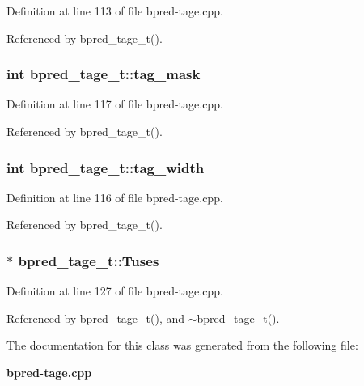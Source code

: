 Definition at line 113 of file bpred-tage.cpp.

Referenced by bpred\_\-tage\_\-t().
\subsubsection[{tag\_\-mask}]{\setlength{\rightskip}{0pt plus 5cm}int {\bf bpred\_\-tage\_\-t::tag\_\-mask}\hspace{0.3cm}{\tt  [protected]}}\label{classbpred__tage__t_f1fa99a0a3aa238218e3fd26b90e717a}




Definition at line 117 of file bpred-tage.cpp.

Referenced by bpred\_\-tage\_\-t().
\subsubsection[{tag\_\-width}]{\setlength{\rightskip}{0pt plus 5cm}int {\bf bpred\_\-tage\_\-t::tag\_\-width}\hspace{0.3cm}{\tt  [protected]}}\label{classbpred__tage__t_f06f3374d0b3cd422c4b8a0dcc4f4592}




Definition at line 116 of file bpred-tage.cpp.

Referenced by bpred\_\-tage\_\-t().
\subsubsection[{Tuses}]{$\ast$ {\bf bpred\_\-tage\_\-t::Tuses}\hspace{0.3cm}{\tt  [protected]}}\label{classbpred__tage__t_2acfc71f9ddb4bf5dc5be7c4bcb93de7}




Definition at line 127 of file bpred-tage.cpp.

Referenced by bpred\_\-tage\_\-t(), and $\sim$bpred\_\-tage\_\-t().

The documentation for this class was generated from the following file:\begin{CompactItemize}
\item 
{\bf bpred-tage.cpp}\end{CompactItemize}
